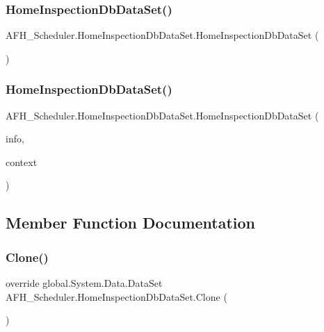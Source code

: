 \subsubsection{HomeInspectionDbDataSet()\hspace{0.1cm}{\footnotesize\ttfamily [1/2]}}
{\footnotesize\ttfamily A\+F\+H\+\_\+\+Scheduler.\+Home\+Inspection\+Db\+Data\+Set.\+Home\+Inspection\+Db\+Data\+Set (\begin{DoxyParamCaption}{ }\end{DoxyParamCaption})}

\mbox{\label{class_a_f_h___scheduler_1_1_home_inspection_db_data_set_a3fbe7481d62e420b29a6b0dd6e78645d}} 
\subsubsection{HomeInspectionDbDataSet()\hspace{0.1cm}{\footnotesize\ttfamily [2/2]}}
{\footnotesize\ttfamily A\+F\+H\+\_\+\+Scheduler.\+Home\+Inspection\+Db\+Data\+Set.\+Home\+Inspection\+Db\+Data\+Set (\begin{DoxyParamCaption}\item[{global\+::\+System.\+Runtime.\+Serialization.\+Serialization\+Info}]{info,  }\item[{global\+::\+System.\+Runtime.\+Serialization.\+Streaming\+Context}]{context }\end{DoxyParamCaption})\hspace{0.3cm}{\ttfamily [protected]}}



\subsection{Member Function Documentation}
\mbox{\label{class_a_f_h___scheduler_1_1_home_inspection_db_data_set_a20af861dc76727a90ac665375445109c}} 
\subsubsection{Clone()}
{\footnotesize\ttfamily override global.\+System.\+Data.\+Data\+Set A\+F\+H\+\_\+\+Scheduler.\+Home\+Inspection\+Db\+Data\+Set.\+Clone (\begin{DoxyParamCaption}{ }\end{DoxyParamCaption})}

